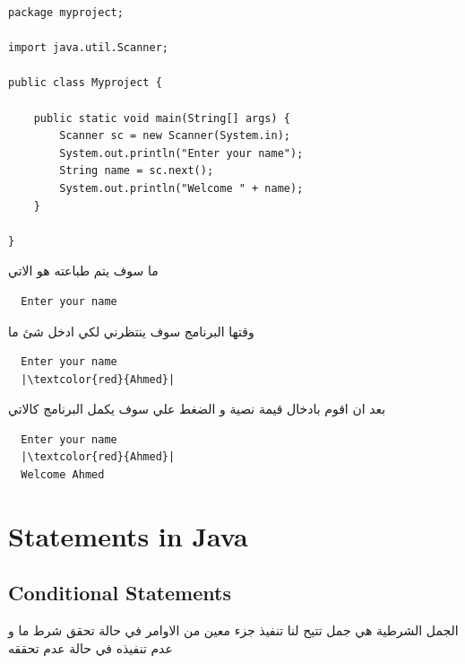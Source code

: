 \newpage
\begin{verbatim}
package myproject;

import java.util.Scanner;

public class Myproject {

    public static void main(String[] args) {
        Scanner sc = new Scanner(System.in);
        System.out.println("Enter your name");
        String name = sc.next();
        System.out.println("Welcome " + name);
    }
    
}
  \end{verbatim}  
  \begin{AR}
     ما سوف يتم طباعته هو الاتي
  \end{AR}
  \begin{verbatim}
  Enter your name
  \end{verbatim}
  \begin{AR}
    وقتها البرنامج سوف ينتظرني لكي ادخل شئ ما 
  \end{AR}
  \begin{verbatim}
  Enter your name
  |\textcolor{red}{Ahmed}|
  \end{verbatim}
  \begin{AR}
    بعد ان اقوم بادخال قيمة نصية و الضغط علي  سوف يكمل البرنامج كالاتي
  \end{AR}
  \begin{verbatim}
  Enter your name
  |\textcolor{red}{Ahmed}|
  Welcome Ahmed
  \end{verbatim}


  \chapter{Statements in Java}
  \thispagestyle{empty}
  \section{Conditional Statements}
  \begin{AR}
    الجمل الشرطية هي جمل تتيح لنا تنفيذ جزء معين من الاوامر في حالة تحقق شرط ما و عدم تنفيذه في حالة عدم تحققه
  \end{AR}

